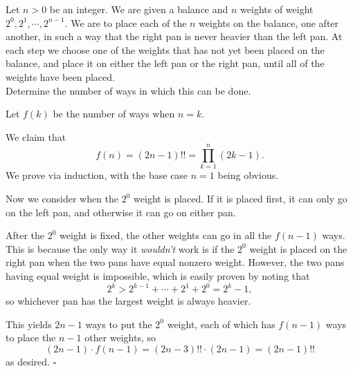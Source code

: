 
\begin{problem}[ISL 2011 C1]
    Let $n > 0$ be an integer. We are given a balance and $n$ weights
    of weight $2^0, 2^1, \cdots, 2^{n-1}$. We are to place each of the
    $n$ weights on the balance, one after another, in such a way that
    the right pan is never heavier than the left pan. At each step we
    choose one of the weights that has not yet been placed on the balance,
    and place it on either the left pan or the right pan, until all of
    the weights have been placed. \\
    Determine the number of ways in which this can be done.
\end{problem}

\begin{solution}[Ritwin]
    Let $f(k)$ be the number of ways when $n=k$.

    We claim that \[f(n) = (2n-1)!! = \prod_{k=1}^n (2k-1).\]
    We prove via induction, with the base case $n=1$ being obvious.

    Now we consider when the $2^0$ weight is placed. If it is placed
    first, it can only go on the left pan, and otherwise it can go on
    either pan.

    After the $2^0$ weight is fixed, the other weights can go in all
    the $f(n-1)$ ways. This is because the only way it \textit{wouldn't}
    work is if the $2^0$ weight is placed on the right pan when the
    two pans have equal nonzero weight. However, the two pans having
    equal weight is impossible, which is easily proven by noting that
    \[2^k > 2^{k-1} + \cdots + 2^1 + 2^0 = 2^k-1,\]
    so whichever pan has the largest weight is always heavier.
    
    This yields $2n-1$ ways to put the $2^0$ weight, each of which
    has $f(n-1)$ ways to place the $n-1$ other weights, so
    \[(2n-1) \cdot f(n-1) = (2n-3)!! \cdot (2n-1) = (2n-1)!!\]
    as desired. $\square$
\end{solution}
